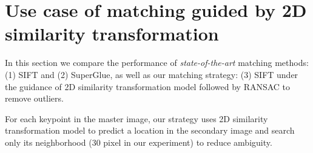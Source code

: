 
\chapter{Use case of matching guided by 2D similarity transformation}
\label{chap:appendix3}
In this section we compare the performance of \textit{state-of-the-art} matching methods: (1) SIFT and (2) SuperGlue, as well as our matching strategy: (3) SIFT under the guidance of 2D similarity transformation model followed by RANSAC to remove outliers. 
\par
For each keypoint in the master image, our strategy uses 2D similarity transformation model to predict a location in the secondary image and search only its neighborhood (30 pixel in our experiment) to reduce ambiguity.\\
